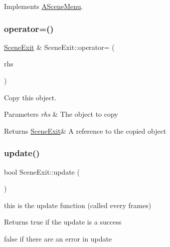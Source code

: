 Implements \hyperlink{class_a_scene_menu_a78bdee98bd7df224524586a060f9bdec}{A\+Scene\+Menu}.

\mbox{\label{class_scene_exit_a5675f92fcd0cd2ca21a310e2a55a8309}} 
\subsubsection{\texorpdfstring{operator=()}{operator=()}}
{\footnotesize\ttfamily \hyperlink{class_scene_exit}{Scene\+Exit} \& Scene\+Exit\+::operator= (\begin{DoxyParamCaption}\item[{\hyperlink{class_scene_exit}{Scene\+Exit} const \&}]{rhs }\end{DoxyParamCaption})}



Copy this object. 


\begin{DoxyParams}{Parameters}
{\em rhs} & The object to copy \\
\hline
\end{DoxyParams}
\begin{DoxyReturn}{Returns}
\hyperlink{class_scene_exit}{Scene\+Exit}\& A reference to the copied object 
\end{DoxyReturn}
\mbox{\label{class_scene_exit_a60fd49ea48551bd3035efa7cabe4d08d}} 
\subsubsection{\texorpdfstring{update()}{update()}}
{\footnotesize\ttfamily bool Scene\+Exit\+::update (\begin{DoxyParamCaption}{ }\end{DoxyParamCaption})\hspace{0.3cm}{\ttfamily [virtual]}}



this is the update function (called every frames) 

\begin{DoxyReturn}{Returns}
true if the update is a success 

false if there are an error in update 
\end{DoxyReturn}


